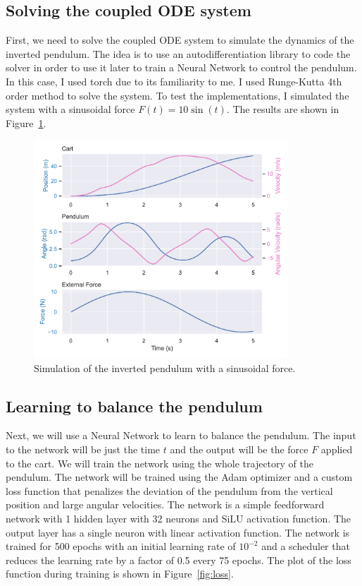 \documentclass[unicode,11pt,a4paper,oneside,numbers=endperiod,openany]{scrartcl}
\begin{document}
\subsection*{Solving the coupled ODE system}
First, we need to solve the coupled ODE system to simulate the dynamics of the
inverted pendulum.
The idea is to use an autodifferentiation library to code the solver in order to
use it later to train a Neural Network to control the pendulum. In this case, I
used torch due to its familiarity to me.
I used Runge-Kutta 4th order method to solve the system. To test the
implementations, I simulated the system with a sinusoidal force $F(t) = 10
\sin(t)$.
The results are shown in Figure~\ref{fig:pendulum}.
\begin{figure}[h]
    \centering
    \includegraphics[width=0.85\textwidth]{../Task1/pendulum.pdf}
    \caption{Simulation of the inverted pendulum with a sinusoidal force.}
    \label{fig:pendulum}
\end{figure}

\subsection*{Learning to balance the pendulum}
Next, we will use a Neural Network to learn to balance the pendulum. The input
to the network will be just the time $t$ and the output will be the force $F$
applied to the cart. We will train the network using the whole trajectory of the
pendulum. The network will be trained using the Adam optimizer and a custom loss
function that penalizes the deviation of the pendulum from the vertical position
and large angular velocities. The network is a simple feedforward network with
1 hidden layer with 32 neurons and SiLU activation function. The output layer
has a single neuron with linear activation function. The network is trained for
500 epochs with an initial learning rate of $10^{-2}$ and a scheduler that
reduces the learning rate by a factor of 0.5 every 75 epochs.
The plot of the loss function during training is shown in Figure~\ref{fig:loss}.
\end{document}
